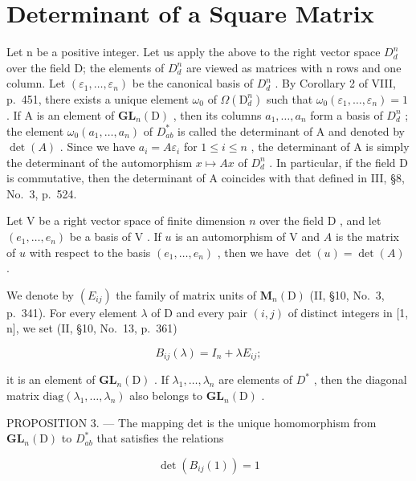 \section{Determinant of a Square Matrix}

Let n be a positive integer. Let us apply the above to the right vector space \(D_{d}^{n}\) over the field D; the elements of \(D_{d}^{n}\) are viewed as matrices with n rows and one column. Let \((\varepsilon_{1},\ldots,\varepsilon_{n})\) be the canonical basis of \(D_{d}^{n}\) . By Corollary 2 of VIII, p.~451, there exists a unique element \(\omega_{0}\) of \(\Omega(\mathrm{D}_{d}^{n})\) such that \(\omega_{0}(\varepsilon_{1},\ldots,\varepsilon_{n})=1\) . If A is an element of \(\mathbf{GL}_{n}(\mathrm{D})\) , then its columns \(a_{1},\ldots,a_{n}\) form a basis of \(D_{d}^{n}\) ; the element \(\omega_{0}(a_{1},\ldots,a_{n})\) of \(D_{ab}^{*}\) is called the determinant of A and denoted by \(\det(A)\) . Since we have \(a_{i}=A\varepsilon_{i}\) for \(1\leqslant i\leqslant n\) , the determinant of A is simply the determinant of the automorphism \(x\mapsto Ax\) of \(D_{d}^{n}\) . In particular, if the field D is commutative, then the determinant of A coincides with that defined in III, §8, No.~3, p.~524.

Let \(\mathrm{V}\) be a right vector space of finite dimension \(n\) over the field \(\mathrm{D}\) , and let \((e_1, \ldots, e_n)\) be a basis of \(\mathrm{V}\) . If \(u\) is an automorphism of \(\mathrm{V}\) and \(A\) is the matrix of \(u\) with respect to the basis \((e_1, \ldots, e_n)\) , then we have \(\det(u) = \det(A)\) .

We denote by \((E_{ij})\) the family of matrix units of \(\mathbf{M}_{n}(\mathrm{D})\) (II, §10, No.~3, p.~341). For every element \(\lambda\) of D and every pair \((i,j)\) of distinct integers in {[}1, n{]}, we set (II, §10, No.~13, p.~361)

\[
B _ {i j} (\lambda) = I _ {n} + \lambda E _ {i j};
\]

it is an element of \(\mathbf{GL}_{n}(\mathrm{D})\) . If \(\lambda_{1},\ldots,\lambda_{n}\) are elements of \(D^{*}\) , then the diagonal matrix \(\mathrm{diag}(\lambda_{1},\ldots,\lambda_{n})\) also belongs to \(\mathbf{GL}_{n}(\mathrm{D})\) .

PROPOSITION 3. --- The mapping det is the unique homomorphism from \(\mathbf{GL}_{n}(\mathrm{D})\) to \(D_{ab}^{*}\) that satisfies the relations

\[
\det (B _ {i j} (1)) = 1\tag{16}
\]

